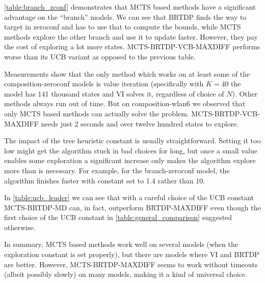 \autoref{table:branch_zconf} demonstrates that MCTS based methods have a
significant advantage on the ``branch'' models. We can see that BRTDP finds the
way to target in zeroconf and has to use that to compute the bounds, while MCTS
methods explore the other branch and use it to update faster. However, they pay
the cost of exploring a lot more states. MCTS-BRTDP-VCB-MAXDIFF performs worse
than its UCB variant as opposed to the previous table.

Measurements show that the only method which works on at least some of the
composition-zeroconf models is value iteration (specifically with $K = 40$ the
model has 141 thousand states and VI solves it, regardless of choice of $N$).
Other methods always run out of time.
But on composition-wlan6 we observed that only MCTS based methods
can actually solve the problem. MCTS-BRTDP-VCB-MAXDIFF needs just 2 seconds and
over twelve hundred states to explore.

The impact of the tree heuristic constant is usually straightforward. Setting it
too low might get the algorithm stuck in bad choices for long, but once a small
value enables some exploration a significant increase only makes the algorithm
explore more than is necessary. For example, for the branch-zeroconf model, the
algorithm finishes faster with constant set to 1.4 rather than 10.

In \autoref{table:ucb_leader} we can see that with a careful choice of the UCB constant
MCTS-BRTDP-MD can, in fact, outperform BRTDP-MAXDIFF even though the first choice
of the UCB constant in \autoref{table:general_comparison} suggested otherwise.

In summary, MCTS based methods work well on several models (when the exploration
constant is set properly), but there are models where VI and BRTDP are better.
However, MCTS-BRTDP-MAXDIFF seems to work without timeouts (albeit possibly
slowly) on many models, making it a kind of universal choice.


